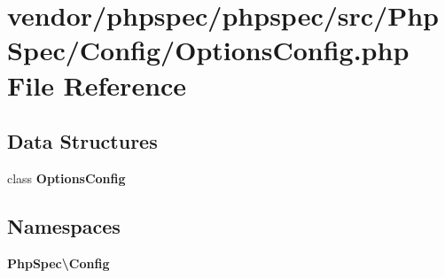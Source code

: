 \section{vendor/phpspec/phpspec/src/\+Php\+Spec/\+Config/\+Options\+Config.php File Reference}
\label{_options_config_8php}
\subsection*{Data Structures}
\begin{DoxyCompactItemize}
\item 
class {\bf Options\+Config}
\end{DoxyCompactItemize}
\subsection*{Namespaces}
\begin{DoxyCompactItemize}
\item 
 {\bf Php\+Spec\textbackslash{}\+Config}
\end{DoxyCompactItemize}
